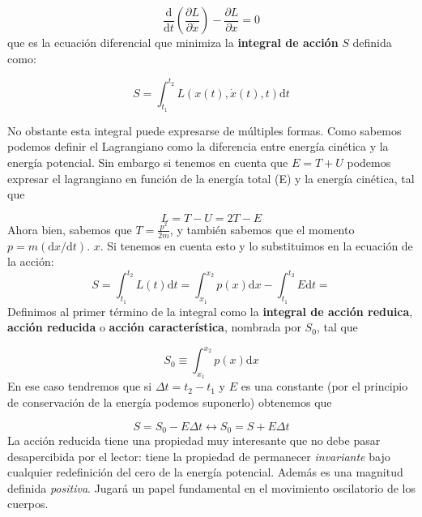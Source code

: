 \documentclass[12pt]{article}
\newcommand{\parentesis}[1]{\left( #1  \right)}
\newcommand{\parciales}[2]{\frac{\partial #1}{\partial #2}}
\newcommand{\pparciales}[2]{\parentesis{\parciales{#1}{#2}}}
\newcommand{\D}{\mathrm{d}}
\newcommand{\derivadas}[2]{\frac{\D #1}{\D #2}}
\begin{document}
\begin{equation}
\derivadas{}{t} \pparciales{L}{\dot{x}} - \parciales{L}{x} = 0
\end{equation}
que es la ecuación diferencial que minimiza la \textbf{integral de acción} $S$ definida como:

\begin{equation}
S = \int_{t_1}^{t_2} L(x(t),\dot{x}(t),t) \D t
\end{equation}

No obstante esta integral puede expresarse de múltiples formas. Como sabemos podemos definir el Lagrangiano como la diferencia entre energía cinética y la energía potencial. Sin embargo si tenemos en cuenta que $E = T + U$ podemos expresar el lagrangiano en función de la energía total (E) y la energía cinética, tal que

\begin{equation}
L = T - U = 2 T - E 
\end{equation}
Ahora bien, sabemos que $T = \frac{p^2}{2 m}$, y también sabemos que el momento $p = m (\D x / \D t)$. $x$. Si tenemos en cuenta esto y lo substituimos en la ecuación de la acción:
\begin{equation}
S = \int_{t_1}^{t_2} L(t) \D t =  \int_{x_1}^{x_2} p(x) \D x   - \int_{t_1}^{t_2} E \D t  = 
\end{equation}
Definimos al primer término de la integral como la \textbf{integral de acción reduica}, \textbf{acción reducida} o \textbf{acción característica}, nombrada por $S_0$, tal que

\begin{equation}
S_0 \equiv  \int_{x_1}^{x_2} p(x) \D x 
\end{equation}
En ese caso tendremos que si $\Delta t = t_2 - t_1$ y $E$ es una constante (por el principio de conservación de la energía podemos suponerlo) obtenemos que

\begin{equation}
S = S_0 - E \Delta t \longleftrightarrow S_0 = S + E \Delta t
\end{equation}
La acción reducida tiene una propiedad muy interesante que no debe pasar desapercibida por el lector:  tiene la propiedad de permanecer \textit{invariante} bajo cualquier redefinición del cero de la energía potencial. Además es una magnitud definida \textit{positiva}. Jugará un papel fundamental en el movimiento oscilatorio de los cuerpos.

\newpage
\end{document}
